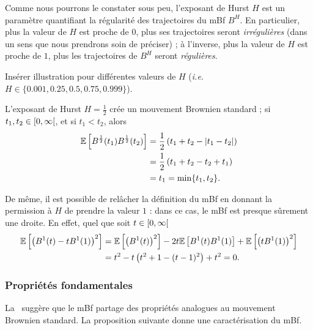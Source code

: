 Comme nous pourrons le constater sous peu, l'exposant de Hurst $H$ est
un paramètre quantifiant la régularité des trajectoires du mBf
$B^H$. En particulier, plus la valeur de $H$ est proche de $0$, plus
ses trajectoires seront \emph{\og{}irrégulières\fg{}} (dans un sens
que nous prendrons soin de préciser) ; à l'inverse, plus la valeur de
$H$ est proche de $1$, plus les trajectoires de $B^H$ seront
\emph{\og{}régulières\fg{}}.

\begin{alert}
  Insérer illustration pour différentes valeurs de $H$ (\emph{i.e.}
  $H\in\{0.001,0.25,0.5,0.75,0.999\}$).
\end{alert}

\begin{remarque}
  \label{rk\string:fBm-basic}
  L'exposant de Hurst $H=\frac{1}{2}$ crée un mouvement Brownien
  standard ; si $t_1,t_2\in\left[0,\infty\right[$, et si $t_1<t_2$, alors
  \begin{align*}
    \mathbb{E}\left[B^{\frac{1}{2}}(t_1)B^{\frac{1}{2}}(t_2)\right] &= \frac{1}{2}\left(t_1+t_2-|t_1-t_2|\right)\\
                                                   &=\frac{1}{2}\left(t_1+t_2-t_2+t_1\right)\\
                                                   &= t_1 = \min\{t_1,t_2\}.
  \end{align*}

  De même, il est possible de relâcher la définition du mBf en donnant
  la permission à $H$ de prendre la valeur $1$ : dans ce cas, le mBf
  est presque sûrement une droite. En effet, quel que soit
  $t\in\left[0,\infty\right[$
  \begin{align*}
    \mathbb{E}\left[\left(B^1(t)-tB^1(1)\right)^2\right] &= \mathbb{E}\left[\left(B^1(t)\right)^2\right]-2t\mathbb{E}\left[B^1(t)B^1(1)\right]+\mathbb{E}\left[\left(tB^1(1)\right)^2\right]\\
                                        &= t^2 -t\left(t^2+1-(t-1)^2\right) + t^2=0.
  \end{align*}
\end{remarque}

\subsubsection{Propriétés fondamentales}
\label{subsubsec\string:fBm-prop}

La~ suggère que le mBf partage des
propriétés analogues au mouvement Brownien standard. La proposition
suivante donne une caractérisation du mBf.

